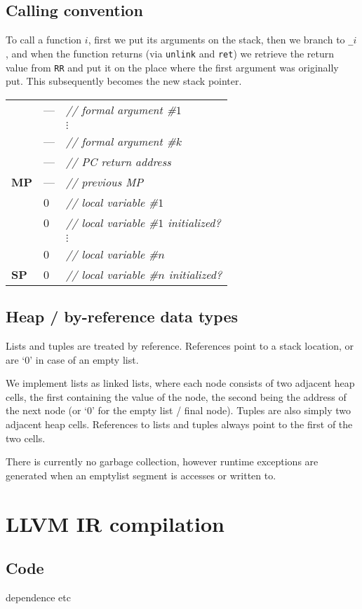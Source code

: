 \documentclass[10pt]{article} %
\theoremstyle{definitionstyle}
\theoremstyle{lemmastyle}
\newcommand{\asmcomment}[1]{\normalfont\itshape// #1}
\newcommand{\asmpointer}[1]{\textbf{#1}}
\newenvironment{Block}[1]{%
\begin{Warning}[singleextra={\path let \p1=(P), \p2=(O) in ($(\x2,0)+0.5*(0,\y1)$) node[mdframeleftlinetitle] {#1};}]%
}{%
\end{Warning}%
}
\begin{document}
\subsection{Calling convention}

To call a function $i$, first we put its arguments on the stack, then we branch to \texttt{_$i$}, and when the function returns (via \texttt{unlink} and \texttt{ret}) we retrieve the return value from \texttt{RR} and put it on the place where the first argument was originally put. This subsequently becomes the new stack pointer.

\begin{Block}{Stack after link}

\begin{tabular}{@{}lll@{}}
  & --- & \asmcomment{formal argument \#$1$} \\
  & & $\vdots$ \\
  & --- & \asmcomment{formal argument \#$k$} \\
  & --- & \asmcomment{PC return address} \\
  \midrule
  \asmpointer{MP} & --- & \asmcomment{previous MP} \\
  & 0 & \asmcomment{local variable \#$1$} \\
  & 0 & \asmcomment{local variable \#$1$ initialized?} \\
  &   & $\vdots$ \\
  & 0 & \asmcomment{local variable \#$n$} \\
  \asmpointer{SP} & 0 & \asmcomment{local variable \#$n$ initialized?}
\end{tabular}

\end{Block}


\subsection{Heap / by-reference data types}

Lists and tuples are treated by reference. References point to a stack location, or are `0' in case of an empty list.

We implement lists as linked lists, where each node consists of two adjacent heap cells, the first containing the value of the node, the second being the address of the next node (or `0' for the empty list / final node). Tuples are also simply two adjacent heap cells. References to lists and tuples always point to the first of the two cells.

There is currently no garbage collection, however runtime exceptions are generated when an emptylist segment is accesses or written to.


\section{LLVM IR compilation}


\begin{appendix}

\section{Code}

dependence etc

\end{appendix}

\cleardoublepage
{}
{}
\nocite{*}
\raggedright

{}
\end{document}
